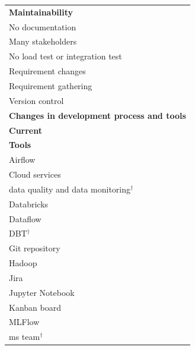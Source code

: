 \documentclass[11pt]{article}
\begin{document}
\begin{longtable}{@{}p{15cm}@{}}
\hspace*{1.5em}\textbf{Maintainability} \\
\hspace*{3.0em}No documentation \\
\hspace*{1.5em}Many stakeholders \\
\hspace*{1.5em}No load test or integration test \\
\hspace*{1.5em}Requirement changes \\
\hspace*{1.5em}Requirement gathering \\
\hspace*{1.5em}Version control \\
\hspace*{0.0em}\textbf{Changes in development process and tools} \\
\hspace*{1.5em}\textbf{Current} \\
\hspace*{3.0em}\textbf{Tools} \\
\hspace*{4.5em}Airflow \\
\hspace*{4.5em}Cloud services \\
\hspace*{4.5em}data quality and data monitoring$^\dagger$ \\
\hspace*{4.5em}Databricks \\
\hspace*{4.5em}Dataflow \\
\hspace*{4.5em}DBT$^\dagger$ \\
\hspace*{4.5em}Git repository \\
\hspace*{4.5em}Hadoop \\
\hspace*{4.5em}Jira \\
\hspace*{4.5em}Jupyter Notebook \\
\hspace*{4.5em}Kanban board \\
\hspace*{4.5em}MLFlow \\
\hspace*{4.5em}ms team$^\dagger$ \\

\end{longtable}
\end{document}
